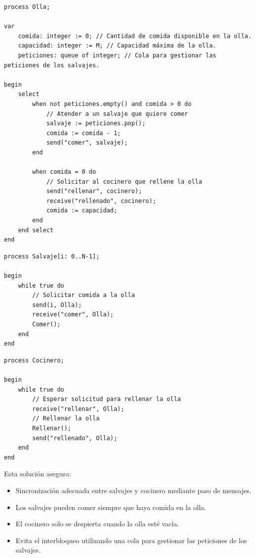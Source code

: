\documentclass[a4paper,12pt]{article}
\begin{document}
\begin{lstlisting}[style=customcpp, caption={Pseudocódigo del proceso Olla}]
process Olla;

var
    comida: integer := 0; // Cantidad de comida disponible en la olla.
    capacidad: integer := M; // Capacidad máxima de la olla.
    peticiones: queue of integer; // Cola para gestionar las peticiones de los salvajes.

begin
    select
        when not peticiones.empty() and comida > 0 do
            // Atender a un salvaje que quiere comer
            salvaje := peticiones.pop();
            comida := comida - 1;
            send("comer", salvaje);
        end

        when comida = 0 do
            // Solicitar al cocinero que rellene la olla
            send("rellenar", cocinero);
            receive("rellenado", cocinero);
            comida := capacidad;
        end
    end select
end
\end{lstlisting}

\begin{lstlisting}[style=customcpp, caption={Pseudocódigo del proceso Salvaje}]
process Salvaje[i: 0..N-1];

begin
    while true do
        // Solicitar comida a la olla
        send(i, Olla);
        receive("comer", Olla);
        Comer();
    end
end
\end{lstlisting}

\begin{lstlisting}[style=customcpp, caption={Pseudocódigo del proceso Cocinero}]
process Cocinero;

begin
    while true do
        // Esperar solicitud para rellenar la olla
        receive("rellenar", Olla);
        // Rellenar la olla
        Rellenar();
        send("rellenado", Olla);
    end
end
\end{lstlisting}

Esta solución asegura:

\begin{itemize}
    \item Sincronización adecuada entre salvajes y cocinero mediante paso de mensajes.
    \item Los salvajes pueden comer siempre que haya comida en la olla.
    \item El cocinero solo se despierta cuando la olla esté vacía.
    \item Evita el interbloqueo utilizando una cola para gestionar las peticiones de los salvajes.
\end{itemize}
\end{document}
